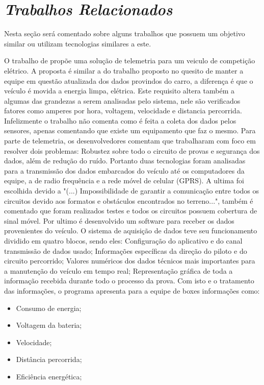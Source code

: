 \chapter{\textit{Trabalhos Relacionados}}
	\label{ch:trabalhos}
Nesta seção será comentado sobre alguns trabalhos que possuem um objetivo similar ou utilizam tecnologias similares a este. 

O trabalho de \cite{gprsTelemetrySystem2013} propõe uma solução de telemetria para um veiculo de competição elétrico. A proposta é similar a do trabalho proposto no quesito de manter a equipe em questão atualizada dos dados provindos do carro, a diferença é que o veículo é movida a energia limpa, elétrica. Este requisito altera também a algumas das grandezas a serem analisadas pelo sistema, nele são verificados fatores como amperes por hora, voltagem, velocidade e distancia percorrida. Infelizmente o trabalho não comenta como é feita a coleta dos dados pelos sensores, apenas comentando que existe um equipamento que faz o mesmo. Para parte de telemetria, os desenvolvedores comentam que trabalharam com foco em resolver dois problemas: Robustez sobre todo o circuito de provas e segurança dos dados, além de redução do ruído. Portanto duas tecnologias foram analisadas para a transmissão dos dados embarcados do veículo até os computadores da equipe, a de radio frequência e a rede móvel de celular (GPRS). A ultima foi escolhida devido a "(...) Impossibilidade de garantir a comunicação entre todos os circuitos devido aos formatos e obstáculos encontrados no terreno...", também é comentado que foram realizados testes e todos os circuitos possuem cobertura de sinal móvel. Por ultimo é desenvolvido um software para receber os dados provenientes do veículo. O sistema de aquisição de dados teve seu funcionamento dividido em quatro blocos, sendo eles: Configuração do aplicativo e do canal transmissão de dados usado; Informações específicas da direção do piloto e do circuito percorrido; Valores numéricos dos dados técnicos mais importantes para a manutenção do veículo em tempo real; Representação gráfica de toda a informação recebida durante todo o processo da prova. Com isto e o tratamento das informações, o programa apresenta para a equipe de boxes informações como:

\begin{itemize}
	\item Consumo de energia; 
	\item Voltagem da bateria;
	\item Velocidade;
	\item Distância percorrida;
	\item Eficiência energética; 
\end{itemize}

